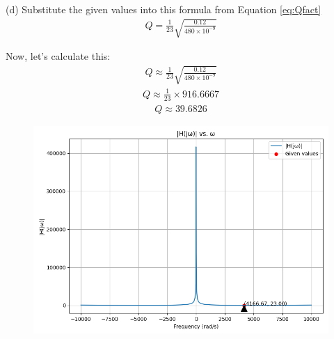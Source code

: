\documentclass[journal,12pt,twocolumn]{IEEEtran}
\theoremstyle{remark}
\begin{document}
(d)
Substitute the given values into this formula from Equation \eqref{eq:Qfact}
\begin{align}
    Q = \frac{1}{23} \sqrt{\frac{0.12}{480 \times 10^{-9}}} 
\end{align}

Now, let's calculate this:
\begin{align}
    Q \approx \frac{1}{23} \sqrt{\frac{0.12}{480 \times 10^{-9}}} 
\end{align}
\begin{align}
    Q \approx \frac{1}{23} \times 916.6667 
\end{align}
\begin{align}
    Q \approx 39.6826 
\end{align}
  \begin{figure}[h!]
  \centering
  \includegraphics[width=\columnwidth]{figs/analog.png}
  \label{fig:bode_Plot}
  \end{figure}
\end{document}
